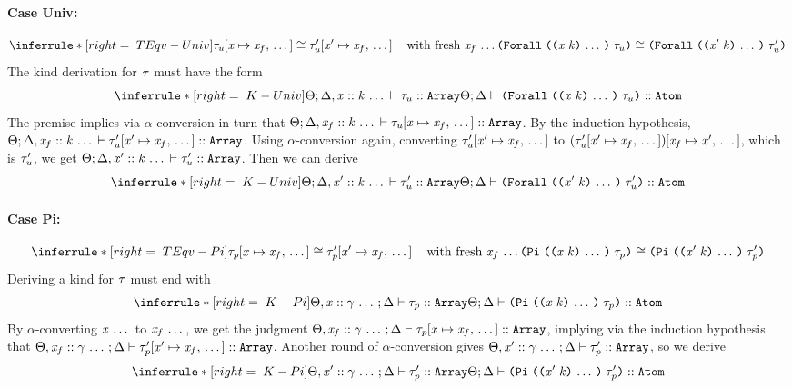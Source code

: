 \begin{sproof}
  \paragraph{Case {\sc Univ}:}
  \[{\infr[TEqv-Univ]
    {\teqv
      {\seqsubst{\type_u}{\var}{\var_f}}
      {\seqsubst{\type_u'}{\var'}{\var_f}}
      \fresh{\sequence{\var_f}}}
    {\teqv
      {\typeuniv{\sequence{\notevar{\var}{\kind}}}{\type_u}}
      {\typeuniv{\sequence{\notevar{\var'}{\kind}}}{\type_u'}}}}\]
  The kind derivation for $\mathit{\tau}$ must have the form
  \[{\infr[K-Univ]
    {\kindof{\sEnv}{\kEnv, \sequence{\haskind{\var}{\kind}}}{\type_u}{\kindarray}}
    {\kindof{\sEnv}{\kEnv}
      {\typeuniv{\sequence{\notevar{\var}{\kind}}}{\type_u}}
      {\kindatom}}}\]
  The premise implies via $\alpha$-conversion in turn that
  $\Theta;\Delta, \mathit{x}_f :: \mathit{k} \, \ldots \, \vdash \mathit{\tau}_u\hspace{-2pt}\left[ \mathit{x} \mapsto \mathit{x}_f, \, \ldots \, \right] :: \text{\tt Array}$.
  By the induction hypothesis,
  $\Theta;\Delta, \mathit{x}_f :: \mathit{k} \, \ldots \, \vdash \mathit{\tau}_u'\hspace{-2pt}\left[ \mathit{x}' \mapsto \mathit{x}_f, \, \ldots \, \right] :: \text{\tt Array}$.
  Using $\alpha$-conversion again,
  converting $\mathit{\tau}_u'\hspace{-2pt}\left[ \mathit{x}' \mapsto \mathit{x}_f, \, \ldots \, \right]$ to
  $\left( \mathit{\tau}_u'\hspace{-2pt}\left[ \mathit{x}' \mapsto \mathit{x}_f, \, \ldots \, \right] \right)\hspace{-2pt}\left[ \mathit{x}_f \mapsto \mathit{x}', \, \ldots \, \right]$,
  which is $\mathit{\tau}_u'$,
  we get
  $\Theta;\Delta, \mathit{x}' :: \mathit{k} \, \ldots \, \vdash \mathit{\tau}_u' :: \text{\tt Array}$.
  Then we can derive
  \[{\infr[K-Univ]
    {\kindof{\sEnv}{\kEnv, \sequence{\haskind{\var'}{\kind}}}
      {\type_u'}
      {\kindarray}}
    {\kindof{\sEnv}{\kEnv}
      {\typeuniv{\sequence{\notevar{\var'}{\kind}}}{\type_u'}}
      {\kindatom}}}\]
  \paragraph{Case {\sc Pi}:}
  \[{\infr[TEqv-Pi]
    {\teqv
      {\seqsubst{\type_p}{\var}{\var_f}}
      {\seqsubst{\type_p'}{\var'}{\var_f}}
      \fresh{\sequence{\var_f}}}
    {\teqv
      {\typedprod{\sequence{\notevar{\var}{\kind}}}{\type_p}}
      {\typedprod{\sequence{\notevar{\var'}{\kind}}}{\type_p'}}}}\]
  Deriving a kind for $\mathit{\tau}$ must end with
  \[{\infr[K-Pi]
    {\kindof{\sEnv, \sequence{\hassort{\var}{\sort}}}{\kEnv}
      {\type_p}
      {\kindarray}}
    {\kindof{\sEnv}{\kEnv}
      {\typedprod{\sequence{\notevar{\var}{\kind}}}{\type_p}}
      {\kindatom}}}\]
  By $\alpha$-converting $\mathit{x} \, \ldots \,$ to $\mathit{x}_f \, \ldots \,$,
  we get the judgment
  $\Theta, \mathit{x}_f :: \mathit{\gamma} \, \ldots \,;\Delta \vdash \mathit{\tau}_p\hspace{-2pt}\left[ \mathit{x} \mapsto \mathit{x}_f, \, \ldots \, \right] :: \text{\tt Array}$,
  implying via the induction hypothesis that
  $\Theta, \mathit{x}_f :: \mathit{\gamma} \, \ldots \,;\Delta \vdash \mathit{\tau}_p'\hspace{-2pt}\left[ \mathit{x}' \mapsto \mathit{x}_f, \, \ldots \, \right] :: \text{\tt Array}$.
  Another round of $\alpha$-conversion gives
  $\Theta, \mathit{x}' :: \mathit{\gamma} \, \ldots \,;\Delta \vdash \mathit{\tau}_p' :: \text{\tt Array}$,
  so we derive
  \[{\infr[K-Pi]
    {\kindof{\sEnv, \sequence{\hassort{\var'}{\sort}}}{\kEnv}
      {\type_p'}
      {\kindarray}}
    {\kindof{\sEnv}{\kEnv}
      {\typedprod{\sequence{\notevar{\var'}{\kind}}}{\type_p'}}
      {\kindatom}}}\]

\end{sproof}
